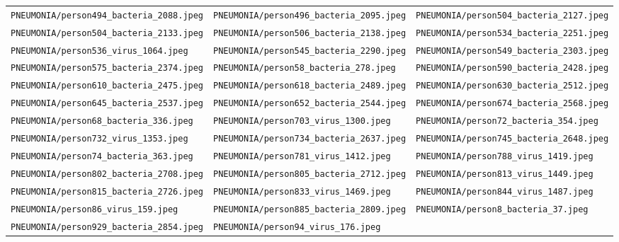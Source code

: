 \begin{center}
\begin{longtable}{lll}
\texttt{PNEUMONIA/person494\_bacteria\_2088.jpeg} & \texttt{PNEUMONIA/person496\_bacteria\_2095.jpeg} & \texttt{PNEUMONIA/person504\_bacteria\_2127.jpeg} \\
\texttt{PNEUMONIA/person504\_bacteria\_2133.jpeg} & \texttt{PNEUMONIA/person506\_bacteria\_2138.jpeg} & \texttt{PNEUMONIA/person534\_bacteria\_2251.jpeg} \\
\texttt{PNEUMONIA/person536\_virus\_1064.jpeg} & \texttt{PNEUMONIA/person545\_bacteria\_2290.jpeg} & \texttt{PNEUMONIA/person549\_bacteria\_2303.jpeg} \\
\texttt{PNEUMONIA/person575\_bacteria\_2374.jpeg} & \texttt{PNEUMONIA/person58\_bacteria\_278.jpeg} & \texttt{PNEUMONIA/person590\_bacteria\_2428.jpeg} \\
\texttt{PNEUMONIA/person610\_bacteria\_2475.jpeg} & \texttt{PNEUMONIA/person618\_bacteria\_2489.jpeg} & \texttt{PNEUMONIA/person630\_bacteria\_2512.jpeg} \\
\texttt{PNEUMONIA/person645\_bacteria\_2537.jpeg} & \texttt{PNEUMONIA/person652\_bacteria\_2544.jpeg} & \texttt{PNEUMONIA/person674\_bacteria\_2568.jpeg} \\
\texttt{PNEUMONIA/person68\_bacteria\_336.jpeg} & \texttt{PNEUMONIA/person703\_virus\_1300.jpeg} & \texttt{PNEUMONIA/person72\_bacteria\_354.jpeg} \\
\texttt{PNEUMONIA/person732\_virus\_1353.jpeg} & \texttt{PNEUMONIA/person734\_bacteria\_2637.jpeg} & \texttt{PNEUMONIA/person745\_bacteria\_2648.jpeg} \\
\texttt{PNEUMONIA/person74\_bacteria\_363.jpeg} & \texttt{PNEUMONIA/person781\_virus\_1412.jpeg} & \texttt{PNEUMONIA/person788\_virus\_1419.jpeg} \\
\texttt{PNEUMONIA/person802\_bacteria\_2708.jpeg} & \texttt{PNEUMONIA/person805\_bacteria\_2712.jpeg} & \texttt{PNEUMONIA/person813\_virus\_1449.jpeg} \\
\texttt{PNEUMONIA/person815\_bacteria\_2726.jpeg} & \texttt{PNEUMONIA/person833\_virus\_1469.jpeg} & \texttt{PNEUMONIA/person844\_virus\_1487.jpeg} \\
\texttt{PNEUMONIA/person86\_virus\_159.jpeg} & \texttt{PNEUMONIA/person885\_bacteria\_2809.jpeg} & \texttt{PNEUMONIA/person8\_bacteria\_37.jpeg} \\
\texttt{PNEUMONIA/person929\_bacteria\_2854.jpeg} & \texttt{PNEUMONIA/person94\_virus\_176.jpeg} & \texttt{} \\
\hline
\end{longtable}
\end{center}

